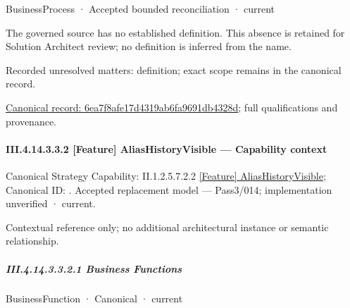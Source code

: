 \label{navigation:III.4.14.3.3.1.2.1}

\label{element:6ea7f8afe17d4319ab6fa9691db4328d}
{\small BusinessProcess · Accepted bounded reconciliation · current}\par

The governed source has no established definition. This absence is retained for Solution Architect review; no definition is inferred from the name.


{\small Recorded unresolved matters: definition; exact scope remains in the canonical record.}\par
{\footnotesize \href{../../../../../../../../continuum/business/business-process/6ea7f8afe17d4319ab6fa9691db4328d.md}{Canonical record: 6ea7f8afe17d4319ab6fa9691db4328d}; full qualifications and provenance.}\par
\paragraph*{III.4.14.3.3.2 [Feature] AliasHistoryVisible — Capability context}
\label{navigation:III.4.14.3.3.2}

{\small Canonical Strategy Capability: II.1.2.5.7.2.2 \hyperref[element:5d8ab81e7a9748e9ac611b3c207eef38]{[Feature] AliasHistoryVisible}; Canonical ID: \texttt{}. Accepted replacement model — Pass3/014; implementation unverified · current.}\par
Contextual reference only; no additional architectural instance or semantic relationship.\par
\subparagraph*{III.4.14.3.3.2.1 Business Functions}
\label{navigation:III.4.14.3.3.2.1}

\label{navigation:III.4.14.3.3.2.1.1}

\label{element:9db2528e180a418eacbad3acf86b3956}
{\small BusinessFunction · Canonical · current}\par

